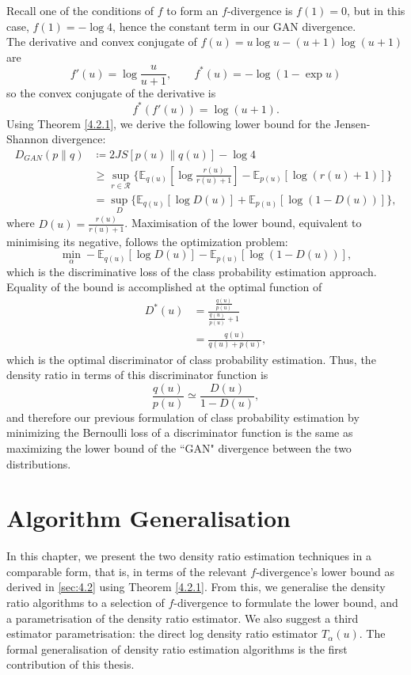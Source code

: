 \documentclass[honours,12pt]{unswthesis}
\newcommand{\E}{\mathbb{E}}
\numberwithin{equation}{section}
\theoremstyle{definition}
\begin{document}
Recall one of the conditions of $f$ to form an $f$-divergence is $f(1)=0$, but in this case, $f(1)=-\log 4$, hence the constant term in our GAN divergence.\\
The derivative and convex conjugate of $f(u)=u\log u-(u+1)\log (u+1)$ are
\[f'(u)=\log \frac{u}{u+1},\qquad f^*(u)=-\log (1-\exp u)\]
so the convex conjugate of the derivative is
\[f^*(f'(u))=\log (u+1).\]
Using Theorem \ref{4.2.1}, we derive the following lower bound for the Jensen-Shannon divergence:
\begin{align*}
D_{GAN}(p\|q)&\coloneqq 2JS[p(u)\|q(u)]-\log 4\\
&\geq \sup_{r\in \mathcal{R}}\{\mathbb{E}_{q(u)}\left[\log \frac{r(u)}{r(u)+1}\right]-\mathbb{E}_{p(u)}[\log(r(u)+1)]\}\\
&=\sup_{D}\{\E_{q(u)}[\log D(u)]+\E_{p(u)}[\log(1-D(u))]\},
\end{align*}
where $D(u)=\frac{r(u)}{r(u)+1}$. Maximisation of the lower bound, equivalent to minimising its negative, follows the optimization problem:
\[\min_\alpha -\E_{q(u)}[\log D(u)]-\E_{p(u)}[\log (1-D(u))],\]
which is the discriminative loss of the class probability estimation approach. Equality of the bound is accomplished at the optimal function of
\begin{align*}
D^*(u)&=\frac{\frac{q(u)}{p(u)}}{\frac{q(u)}{p(u)}+1}\\
&=\frac{q(u)}{q(u)+p(u)},
\end{align*}
which is the optimal discriminator of class probability estimation. Thus, the density ratio in terms of this discriminator function is 
\[\frac{q(u)}{p(u)}\simeq \frac{D(u)}{1-D(u)},\]
and therefore our previous formulation of class probability estimation by minimizing the Bernoulli loss of a discriminator function is the same as maximizing the lower bound of the ``GAN" divergence between the two distributions.
\chapter{Algorithm Generalisation}\label{ch5}
In this chapter, we present the two density ratio estimation techniques in a comparable form, that is, in terms of the relevant $f$-divergence's lower bound as derived in \autoref{sec:4.2} using Theorem \ref{4.2.1}. From this, we generalise the density ratio algorithms to a selection of $f$-divergence to formulate the lower bound, and a parametrisation of the density ratio estimator. We also suggest a third estimator parametrisation: the direct log density ratio estimator $T_\alpha(u)$. The formal generalisation of density ratio estimation algorithms is the first contribution of this thesis.
\end{document}
